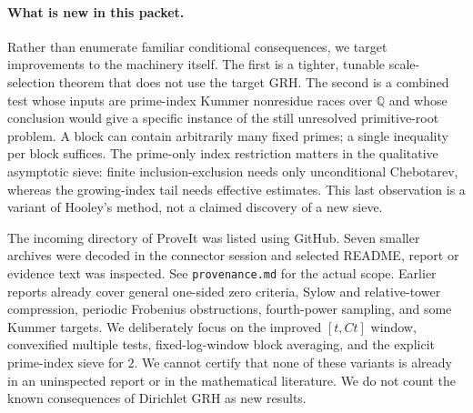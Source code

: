 \documentclass[11pt,letterpaper]{article}
\theoremstyle{definition}\newtheorem{definition}[theorem]{Definition}
\theoremstyle{remark}\newtheorem{remark}[theorem]{Remark}
\newcommand{\Q}{\mathbb Q}\newcommand{\C}{\mathbb C}\newcommand{\R}{\mathbb R}\newcommand{\F}{\mathbb F}\newcommand{\ord}{\operatorname{ord}}\newcommand{\Li}{\operatorname{Li}}\newcommand{\Gal}{\operatorname{Gal}}\newcommand{\Res}{\operatorname{Res}}\newcommand{\ind}{\operatorname{Ind}}\newcommand{\one}{\mathbf 1}
\begin{document}
\paragraph{What is new in this packet.} Rather than enumerate familiar conditional consequences, we target improvements to the machinery itself. The first is a tighter, tunable scale-selection theorem that does not use the target GRH. The second is a combined test whose inputs are prime-index Kummer nonresidue races over $\Q$ and whose conclusion would give a specific instance of the still unresolved primitive-root problem. A block can contain arbitrarily many fixed primes; a single inequality per block suffices. The prime-only index restriction matters in the qualitative asymptotic sieve: finite inclusion-exclusion needs only unconditional Chebotarev, whereas the growing-index tail needs effective estimates. This last observation is a variant of Hooley's method, not a claimed discovery of a new sieve.

The incoming directory of ProveIt was listed using GitHub. Seven smaller archives were decoded in the connector session and selected README, report or evidence text was inspected. See \texttt{provenance.md} for the actual scope. Earlier reports already cover general one-sided zero criteria, Sylow and relative-tower compression, periodic Frobenius obstructions, fourth-power sampling, and some Kummer targets. We deliberately focus on the improved $[t,Ct]$ window, convexified multiple tests, fixed-log-window block averaging, and the explicit prime-index sieve for $2$. We cannot certify that none of these variants is already in an uninspected report or in the mathematical literature. We do not count the known consequences of Dirichlet GRH as new results.
\end{document}
